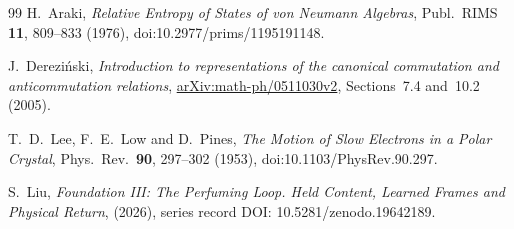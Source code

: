 \begin{thebibliography}{99}
H.~Araki, \emph{Relative Entropy of States of von Neumann Algebras},
Publ.\ RIMS \textbf{11}, 809--833 (1976),
doi:10.2977/prims/1195191148.

J.~Derezi\'nski, \emph{Introduction to representations of the canonical
commutation and anticommutation relations},
\href{https://arxiv.org/abs/math-ph/0511030}{arXiv:math-ph/0511030v2},
Sections~7.4 and~10.2 (2005).

T.~D.~Lee, F.~E.~Low and D.~Pines,
\emph{The Motion of Slow Electrons in a Polar Crystal},
Phys.\ Rev.\ \textbf{90}, 297--302 (1953),
doi:10.1103/PhysRev.90.297.

S.~Liu, \emph{Foundation III: The Perfuming Loop. Held Content,
Learned Frames and Physical Return}, (2026),
series record DOI: 10.5281/zenodo.19642189.

\end{thebibliography}

